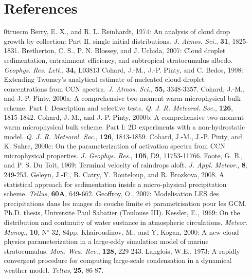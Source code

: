 \section{References}
\parindent 0truecm
\por
Berry, E. X., and R. L. Reinhardt, 1974: An analysis of cloud drop growth by
        collection: Part II. single initial distributions.
        {\it J. Atmos. Sci.},
        {\bf 31},
        1825-1831.
\por
Bretherton, C. S., P. N. Blossey, and J. Uchida, 2007: Cloud droplet sedimentation, entrainment efficiency,
           and subtropical stratocumulus albedo.
           {\it Geophys. Res. Lett.},
           {\bf 34,} 
           L03813
\por
Cohard, J.-M., J.-P. Pinty, and C. Bedos, 1998: Extending Twomey's analytical
        estimate of nucleated cloud droplet concentrations from CCN spectra.
        {\it J. Atmos. Sci.},
        {\bf 55,}
        3348-3357.
\por
Cohard, J.-M., and J.-P. Pinty, 2000a: A comprehensive two-moment warm
        microphysical bulk scheme. Part I: Description and selective tests.
        {\it Q. J. R. Meteorol. Soc.},
        {\bf 126},
        1815-1842.
\por
Cohard, J.-M., and J.-P. Pinty, 2000b: A comprehensive two-moment warm
        microphysical bulk scheme. Part I: 2D experiments with a
        non-hydrostatic model.
        {\it Q. J. R. Meteorol. Soc.},
        {\bf 126},
        1843-1859.
\por
Cohard, J.-M., J.-P. Pinty, and K. Suhre, 2000c: On the parameterization of
        activation spectra from CCN microphysical properties.
        {\it J. Geophys.  Res.},
        {\bf 105},
        D9,
        11753-11766.
\por
Foote, G. B., and P. S. Du Toit, 1969: Terminal velocity of raindrops aloft.
{\it J. Appl. Meteor.}, {\bf 8}, 249-253.
\por
Geleyn, J.-F., B. Catry, Y. Bouteloup, and R. Brozkova, 2008. A statistical approach for 
        sedimentation inside a micro-physical precipitation scheme.
        {\it Tellus},
        {\bf 60A},
        649-662.
\por
Geoffroy, O., 2007: Modelisation LES des precipitations dans les nuages de couche limite et parametrisation pour les GCM, Ph.D. thesis, Universite Paul Sabatier (Toulouse III).
\por
Kessler, E., 1969: On the distribution and continuity of water sustance in
atmospheric circulations. {\it Meteor. Monog.}, {\bf 10}, N$^\circ$ 32, 84pp.
\por
Khairoudinov, M., and Y. Kogan, 2000: A new cloud physics parameterization
        in a large-eddy simulation model of marine stratocumulus.
        {\it Mon. Wea. Rev.},
        {\bf 128,}
        229-243.
\por
Langlois, W.E., 1973: A rapidly convergent procedure for computing large-scale
condensation in a dynamical weather model. {\it Tellus}, {\bf 25}, 86-87.
